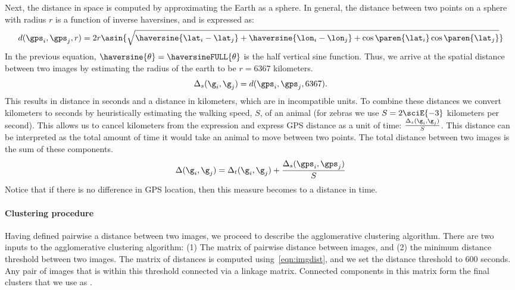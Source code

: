 Next, the distance in space is computed by approximating the Earth as a
  sphere.
In general, the distance between two points on a sphere with radius $r$
  is a function of inverse haversines, and is expressed as:
\begin{equation}\label{eqn:geodistance}
    d(\gps_i, \gps_j, r) =
        2 r \asin{\sqrt{
            \haversine{\lat_i - \lat_j} +
            \haversine{\lon_i - \lon_j} +
            \cos\paren{\lat_i} \cos\paren{\lat_j}}}
\end{equation}
In the previous equation, $\haversine{\theta} = \haversineFULL{\theta}$
  is the half vertical sine function.
Thus, we arrive at the spatial distance between two images by
  estimating the radius of the earth to be $r=6367$ kilometers.
\begin{equation}
    \Delta_s(\g_i, \g_j) = d(\gps_i, \gps_j, 6367).
\end{equation}
This results in distance in seconds and a distance in kilometers, which
  are in incompatible units.
To combine these distances we convert kilometers to seconds by
  heuristically estimating the walking speed, $S$, of an animal (for
  zebras we use $S=2\sciE{-3}$ kilometers per second).
This allows us to cancel kilometers from the expression and express GPS
  distance as a unit of time:
$\frac{\Delta_s(\g_i, \g_j)}{S}$.
This distance can be interpreted as the total amount of time it would
  take an animal to move between two points.
The total distance between two images is the sum of these components.
\begin{equation}\label{eqn:imgdist}
    \Delta(\g_i, \g_j) =
        \Delta_t(\g_i, \g_j) + \frac{\Delta_s(\gps_i, \gps_j)}{S}
\end{equation}
Notice that if there is no difference in GPS location, then this
  measure becomes to a distance in time.

\paragraph{Clustering procedure}
Having defined pairwise a distance between two images, we proceed to
  describe the agglomerative clustering algorithm.
There are two inputs to the agglomerative clustering algorithm:
(1) The matrix of pairwise distance between images, and
(2) the minimum distance threshold between two images.
The matrix of distances is computed using~\cref{eqn:imgdist}, and we
  set the distance threshold to $600$ seconds.
Any pair of images that is within this threshold connected via a
  linkage matrix.
Connected components in this matrix form the final clusters that we use
  as \occurrences{}.

